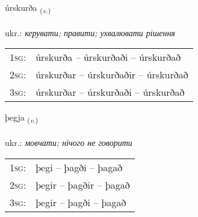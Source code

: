 \documentclass[frontgrid, backgrid]{flacards}\usepackage[]{graphicx}\usepackage[]{xcolor}
\begin{document}
\renewcommand{\flhead}{\vskip5pt \fboxsep=0pt {\small\bfseries\footnotesize Sagnorð | дієслово}}
\renewcommand{\fcfoot}{\vskip5pt \fboxsep=0pt \hspace{2pt}{\small\bfseries\footnotesize 3K}}

\renewcommand{\blhead}{\vskip5pt {\small\bfseries\footnotesize Sagnorð | дієслово }}
\renewcommand{\bcfoot}{\vskip5pt \hspace{2pt}{\small\bfseries\footnotesize 3K}}


{úrskurða \small{\textsubscript{(\textit{v.})}} \\[1ex] %
\textphonetic{[ur̥skʏrða]} \\
ukr.: \emph{керувати; правити; ухвалювати рішення} \\  [2ex]
\renewcommand*{\arraystretch}{0.8}
\begin{tabular}{p{1cm}l}
\textsc{1sg}: & úrskurða -- úrskurðaði -- úrskurðað \\ 
\textsc{2sg}: & úrskurðar -- úrskurðaðir -- úrskurðað \\ 
\textsc{3sg}: & úrskurðar -- úrskurðaði -- úrskurðað \\ 
\end{tabular}
}

\renewcommand{\flhead}{\vskip5pt \fboxsep=0pt {\small\bfseries\footnotesize Sagnorð | дієслово}}
\renewcommand{\fcfoot}{\vskip5pt \fboxsep=0pt \hspace{2pt}{\small\bfseries\footnotesize 3K}}

\renewcommand{\blhead}{\vskip5pt {\small\bfseries\footnotesize Sagnorð | дієслово }}
\renewcommand{\bcfoot}{\vskip5pt \hspace{2pt}{\small\bfseries\footnotesize 3K}}


{þegja \small{\textsubscript{(\textit{v.})}} \\[1ex] %
\textphonetic{[θeija]} \\
ukr.: \emph{мовчати; нічого не говорити} \\  [2ex]
\renewcommand*{\arraystretch}{0.8}
\begin{tabular}{p{1cm}l}
\textsc{1sg}: & þegi -- þagði -- þagað \\ 
\textsc{2sg}: & þegir -- þagðir -- þagað \\ 
\textsc{3sg}: & þegir -- þagði -- þagað \\ 
\end{tabular}
}
\end{document}
